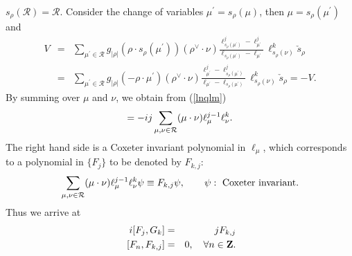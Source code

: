 \documentclass[a4paper,12pt]{article}
\begin{document}
$s_\rho({\mathcal R})={\mathcal R}$.
Consider the change of variables
$\mu^\prime=s_\rho(\mu)$, then $\mu=s_\rho(\mu^\prime)$
and
\begin{eqnarray*}
V &=& \sum_{\mu^\prime\in{\mathcal R}}
g_{|\rho|}(\rho\cdot s_\rho(\mu^\prime))(\rho^\vee\!\cdot\nu)
\frac{\ell_{s_\rho(\mu^\prime)}^j-\ell_{\mu^\prime}^j}
{\ell_{s_\rho(\mu^\prime)}-
\ell_{\mu^\prime}}\,\ell^k_{s_\rho(\nu)}\check{s}_\rho\\
&=& \sum_{\mu^\prime\in{\mathcal R}}
g_{|\rho|}(-\rho\cdot\mu^\prime)(\rho^\vee\!\cdot\nu)
\frac{\ell_{\mu^\prime}^j-\ell_{s_\rho(\mu^\prime)}^j}
{\ell_{\mu^\prime}-\ell_{s_\rho(\mu^\prime)}}\,
\ell^k_{s_\rho(\nu)}\check{s}_\rho=-V.
\end{eqnarray*}
By summing over $\mu$ and $\nu$, we obtain from (\ref{lnqlm})
\begin{equation}
[\sum_{\mu\in{\cal R}}\ell_\mu^j,
\sum_{\nu\in{\cal R}}q\cdot\nu\,\ell_\nu^k]
=-ij\sum_{\mu,\nu\in{\cal R}}
(\mu\cdot\nu)\ell_\mu^{j-1}\ell^k_\nu.
\end{equation}
The right hand side is a Coxeter invariant polynomial in $\ell_\mu$,
which corresponds to a polynomial
in $\{F_j\}$ to be denoted by $F_{k,j}$:
\begin{equation}
\sum_{\mu,\nu\in{\cal R}}
(\mu\cdot\nu)\ell_\mu^{j-1}\ell^k_\nu\psi\equiv F_{k,j}\psi,
\qquad \psi:\ \mbox{Coxeter invariant}.
\label{fjkdef}
\end{equation}
Thus we arrive at
\begin{eqnarray}
 i[F_j,G_k]&=&jF_{k,j}
\label{fgcomm}\\
\ [F_n,F_{k,j}]&=&0,\quad \forall n\in{\bf Z}.
\label{fjkvan}
\end{eqnarray}
\end{document}
